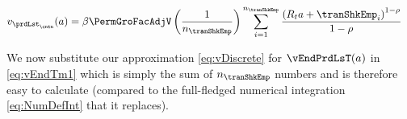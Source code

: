 \documentclass[titlepage, headings=optiontotocandhead]{econtex}
\begin{document}
\nopagebreak

  \begin{equation}\begin{gathered}\begin{aligned}
        v_{{\prdLst}_\cntn}(a)  & =   \beta \PermGroFacAdjV\left(\frac{1}{n_{\tranShkEmp}}\right)\sum_{i=1}^{n_{\tranShkEmp}}   \frac{\left(R_{t} a + \tranShkEmp_{i}\right)^{1-\rho}}{1-\rho} \label{eq:vDiscrete}
      \end{aligned}\end{gathered}\end{equation}

We now substitute our approximation \eqref{eq:vDiscrete} for $\vEndPrdLsT(a)$ in \eqref{eq:vEndTm1} which is simply the sum of $n_{\tranShkEmp}$ numbers and is therefore easy to calculate (compared to the full-fledged numerical integration \eqref{eq:NumDefInt} that it replaces).

\end{document}
